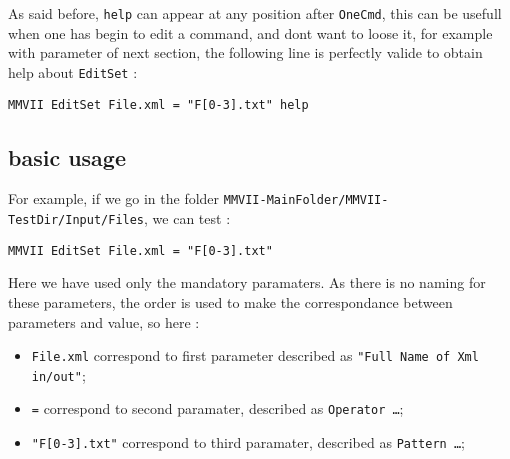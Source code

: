 \documentclass[a4paper]{book}
\newcommand{\MMVIDIR}{{\tt MMVII-MainFolder/}}
\begin{document}
As said before, {\tt help} can appear at any position after {\tt OneCmd}, this can be 
usefull when one has begin to edit a command, and dont want to loose it, for example
with parameter of next section, the following line is perfectly valide to obtain
help about   {\tt EditSet} :

\begin{verbatim}
MMVII EditSet File.xml = "F[0-3].txt" help
\end{verbatim}


\subsection{basic usage}

For example, if we go in the folder  {\tt {\MMVIDIR}MMVII-TestDir/Input/Files}, we can test :

\begin{verbatim}
MMVII EditSet File.xml = "F[0-3].txt"
\end{verbatim}

Here we have used  only the mandatory paramaters. As there is no naming for these parameters,
the order is used to make the correspondance between parameters
and value, so here :

\begin{itemize}
   \item  {\tt File.xml} correspond to first parameter described as {\tt "Full Name of Xml in/out"};
   \item  {\tt =} correspond to second paramater, described as {\tt  Operator \dots};
   \item  {\tt "F[0-3].txt"} correspond to third paramater, described as {\tt Pattern \dots};
\end{itemize}
\end{document}
